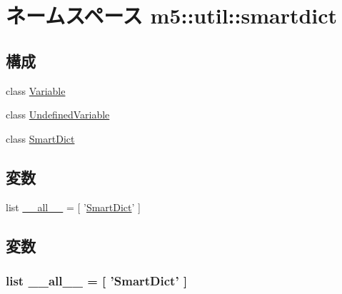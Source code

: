 \hypertarget{namespacem5_1_1util_1_1smartdict}{
\section{ネームスペース m5::util::smartdict}
\label{namespacem5_1_1util_1_1smartdict}
}
\subsection*{構成}
\begin{DoxyCompactItemize}
\item 
class \hyperlink{classm5_1_1util_1_1smartdict_1_1Variable}{Variable}
\item 
class \hyperlink{classm5_1_1util_1_1smartdict_1_1UndefinedVariable}{UndefinedVariable}
\item 
class \hyperlink{classm5_1_1util_1_1smartdict_1_1SmartDict}{SmartDict}
\end{DoxyCompactItemize}
\subsection*{変数}
\begin{DoxyCompactItemize}
\item 
list \hyperlink{namespacem5_1_1util_1_1smartdict_aa4a022e6ddacd362b83964da5cc5d044}{\_\-\_\-all\_\-\_\-} = \mbox{[} '\hyperlink{classm5_1_1util_1_1smartdict_1_1SmartDict}{SmartDict}' \mbox{]}
\end{DoxyCompactItemize}


\subsection{変数}
\hypertarget{namespacem5_1_1util_1_1smartdict_aa4a022e6ddacd362b83964da5cc5d044}{
\subsubsection[{\_\-\_\-all\_\-\_\-}]{\setlength{\rightskip}{0pt plus 5cm}list {\bf \_\-\_\-all\_\-\_\-} = \mbox{[} '{\bf SmartDict}' \mbox{]}}}
\label{namespacem5_1_1util_1_1smartdict_aa4a022e6ddacd362b83964da5cc5d044}

